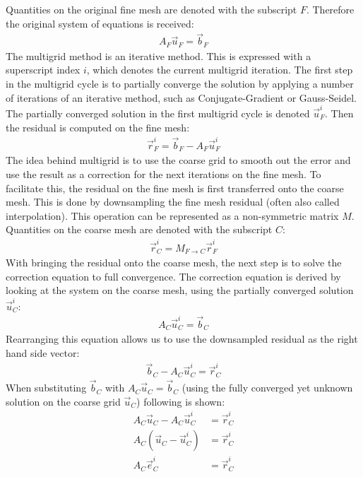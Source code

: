 Quantities on the original fine mesh are denoted with the subscript $F$. Therefore the original system of equations is received:
\begin{align}
\nonumber
A_F\vec{u}_F = \vec{b}_F
\end{align}
The multigrid method is an iterative method. This is expressed with a superscript index $i$, which denotes the current multigrid iteration. The first step in the multigrid cycle is to partially converge the solution by applying a number of iterations of an iterative method, such as Conjugate-Gradient or Gauss-Seidel. The partially converged solution in the first multigrid cycle is denoted $\vec{u}_F^i$. Then the residual is computed on the fine mesh:
\begin{align}
\nonumber
\vec{r}_F^i = \vec{b}_F-A_F\vec{u}_F^i
\end{align}
The idea behind multigrid is to use the coarse grid to smooth out the error and use the result as a correction for the next iterations on the fine mesh. To facilitate this, the residual on the fine mesh is first transferred onto the coarse mesh. This is done by downsampling the fine mesh residual (often also called interpolation). This operation can be represented as a non-symmetric matrix $M$. Quantities on the coarse mesh are denoted with the subscript $C$:
\begin{align}
\nonumber
\vec{r}_C^i = M_{F\rightarrow C} \vec{r}_F^i
\end{align}
With bringing the residual onto the coarse mesh, the next step is to solve the correction equation to full convergence. The correction equation is derived by looking at the system on the coarse mesh, using the partially converged solution $\vec{u}_C^i$:
\begin{align}
\nonumber
A_C\vec{u}_C^i = \vec{b}_C
\end{align}
Rearranging this equation allows us to use the downsampled residual as the right hand side vector:
\begin{align}
\nonumber
\vec{b}_C - A_C\vec{u}_C^i = \vec{r}_C^i
\end{align}
When substituting $\vec{b}_C$ with $A_C\vec{u}_C=\vec{b}_C$ (using the fully converged yet unknown solution on the coarse grid $\vec{u}_C$) following is shown:
\begin{align}
A_C\vec{u}_C - A_C\vec{u}_C^i &= \vec{r}_C^i
\nonumber
\\
A_C\left(\vec{u}_C-\vec{u}_C^i\right) &= \vec{r}_C^i
\nonumber
\\
A_C\vec{e}_C^i &= \vec{r}_C^i
\label{eq:da_correction_equation}
\end{align}
